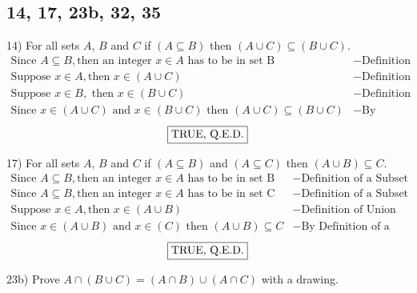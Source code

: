\documentclass[11pt]{article}
\newcommand*{\mybox}[1]{\framebox{#1}}
\begin{document}
\subsection{14, 17, 23b, 32, 35}
\begin{flushleft}

14) For all sets $A$, $B$ and $C$ if $(A\subseteq B)$ then $(A\cup C)\subseteq (B\cup C)$.
\vspace{-3mm}
\begin{align*}
\text{Since } A\subseteq B, \text{then an integer }x \in A \text{ has to be in set B }&- \text{Definition of a Subset}\\
\text{Suppose } x \in A, \text{then } x \in (A\cup C) &- \text{Definition of Union}\\
\text{Suppose } x \in B, \text{ then } x\in (B\cup C) &- \text{Definition of Union}\\
\text{Since } x \in (A\cup C) \text{ and }  x\in (B\cup C) \text{ then } (A\cup C)\subseteq (B\cup C) &- \text{By Definition of a subset}
\end{align*}
\vspace{-5mm}
$$\text{\mybox{TRUE, Q.E.D.}}$$

\hrulefill

17) For all sets $A$, $B$ and $C$ if $(A\subseteq B)$ and $(A\subseteq C) $ then $(A\cup B)\subseteq C$.
\vspace{-3mm}
\begin{align*}
\text{Since } A\subseteq B, \text{then an integer }x \in A \text{ has to be in set B }&- \text{Definition of a Subset}\\
\text{Since } A\subseteq B, \text{then an integer }x \in A \text{ has to be in set C }&- \text{Definition of a Subset}\\
\text{Suppose } x \in A, \text{then } x \in (A\cup B) &- \text{Definition of Union}\\
\text{Since } x \in (A\cup B) \text{ and }  x \in (C) \text{ then } (A\cup      B)\subseteq C &- \text{By Definition of a subset}
\end{align*}
\vspace{-5mm}
$$\text{\mybox{TRUE, Q.E.D.}}$$

\hrulefill

23b) Prove $A \cap (B \cup C) = (A\cap B)\cup (A\cap C) $ with a drawing.

\vspace{34mm}

\hrulefill


\end{flushleft}
\end{document}
